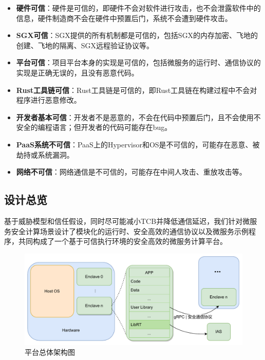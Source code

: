 \begin{itemize}
    \item \textbf{硬件可信}：硬件是可信的，即硬件不会对软件进行攻击，也不会泄露软件中的信息，硬件制造商不会在硬件中预置后门，系统不会遭到硬件攻击。
    \item \textbf{SGX可信}：SGX提供的所有机制都是可信的，包括SGX的内存加密、飞地的创建、飞地的隔离、SGX远程验证协议等。
    \item \textbf{平台可信}：项目平台本身的实现是可信的，包括微服务的运行时、通信协议的实现是正确无误的，且没有恶意代码。
    \item \textbf{Rust工具链可信}：Rust工具链是可信的，即Rust工具链在构建过程中不会对程序进行恶意修改。
    \item \textbf{开发者基本可信}：开发者不是恶意的，不会在代码中预置后门，且不会使用不安全的编程语言；但开发者的代码可能存在bug。
    \item \textbf{PaaS系统不可信}：PaaS上的Hypervisor和OS是不可信的，可能存在恶意、被劫持或系统漏洞。
    \item \textbf{网络不可信}：网络通信是不可信的，可能存在中间人攻击、重放攻击等。
\end{itemize}

\subsection{设计总览}

基于威胁模型和信任假设，同时尽可能减小TCB并降低通信延迟，我们针对微服务安全计算场景设计了模块化的运行时、安全高效的通信协议以及微服务示例程序，共同构成了一个基于可信执行环境的安全高效的微服务计算平台。

\begin{figure}[!ht]
    \centering
    \includegraphics[width=.8\textwidth]{figures/architecture.pdf}
    \caption{平台总体架构图}
    \label{fig:architecture}
\end{figure}

